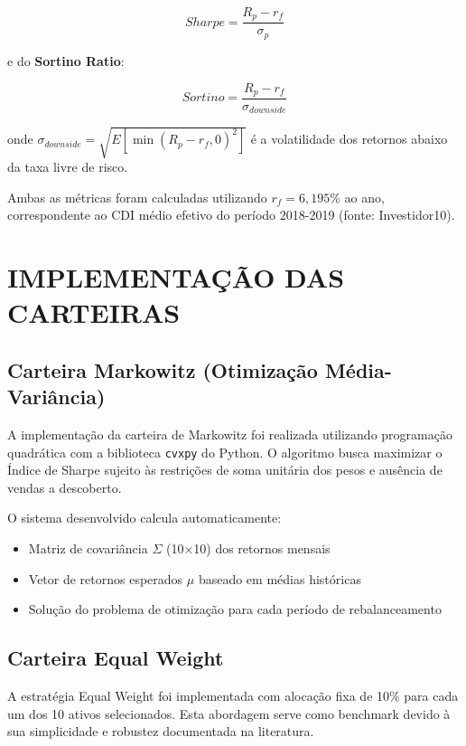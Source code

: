 \begin{equation}
Sharpe = \frac{R_p - r_f}{\sigma_p}
\end{equation}

e do \textbf{Sortino Ratio}:

\begin{equation}
Sortino = \frac{R_p - r_f}{\sigma_{downside}}
\end{equation}

onde $\sigma_{downside} = \sqrt{E[\min(R_p - r_f, 0)^2]}$ é a volatilidade dos retornos abaixo da taxa livre de risco.

Ambas as métricas foram calculadas utilizando $r_f = 6,195\%$ ao ano, correspondente ao CDI médio efetivo do período 2018-2019 (fonte: Investidor10).

\section{IMPLEMENTAÇÃO DAS CARTEIRAS}

\subsection{Carteira Markowitz (Otimização Média-Variância)}

A implementação da carteira de Markowitz foi realizada utilizando programação quadrática com a biblioteca \texttt{cvxpy} do Python. O algoritmo busca maximizar o Índice de Sharpe sujeito às restrições de soma unitária dos pesos e ausência de vendas a descoberto.

O sistema desenvolvido calcula automaticamente:
\begin{itemize}
    \item Matriz de covariância $\Sigma$ (10×10) dos retornos mensais
    \item Vetor de retornos esperados $\mu$ baseado em médias históricas
    \item Solução do problema de otimização para cada período de rebalanceamento
\end{itemize}

\subsection{Carteira Equal Weight}

A estratégia Equal Weight foi implementada com alocação fixa de 10\% para cada um dos 10 ativos selecionados. Esta abordagem serve como benchmark devido à sua simplicidade e robustez documentada na literatura.

